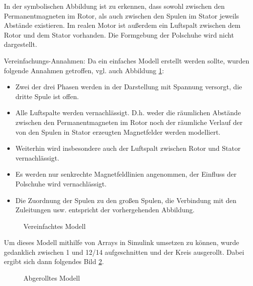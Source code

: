 In der symbolischen Abbildung ist zu erkennen, dass sowohl zwischen den Permanentmagneten im Rotor, als auch zwischen den Spulen im Stator jeweils Abstände existieren. 
Im realen Motor ist außerdem ein Luftspalt zwischen dem Rotor und dem Stator vorhanden. 
Die Formgebung der Polschuhe wird nicht dargestellt.


Vereinfachungs-Annahmen: 
Da ein einfaches Modell erstellt werden sollte, wurden folgende Annahmen getroffen, vgl. auch Abbildung \ref{FigVereinfachtesModell}:
\begin{itemize}
	\item Zwei der drei Phasen werden in der Darstellung mit Spannung versorgt, die dritte Spule ist offen.
	\item Alle Luftspalte werden vernachlässigt. D.h. weder die räumlichen Abstände zwischen den Permanentmagneten im Rotor noch der räumliche Verlauf der von den Spulen in Stator erzeugten Magnetfelder werden modelliert. 
	\item Weiterhin wird insbesondere auch der Luftspalt zwischen Rotor und Stator vernachlässigt.
	\item Es werden nur senkrechte Magnetfeldlinien angenommen, der Einfluss der Polschuhe wird vernachlässigt.
	\item Die Zuordnung der Spulen zu den großen Spulen, die Verbindung mit den Zuleitungen usw. entspricht der vorhergehenden Abbildung. 
\end{itemize}

\begin{figure}[htbp]
	\begin{center}
		
		\caption{Vereinfachtes Modell}
		\label{FigVereinfachtesModell}
	\end{center}
	
\end{figure}


Um dieses Modell mithilfe von Arrays in Simulink umsetzen zu können, wurde gedanklich zwischen 1 und 12/14 aufgeschnitten und der Kreis ausgerollt. Dabei ergibt sich dann folgendes Bild \ref{FigAbgerolltesModell}.


\begin{figure}[htbp]
	\begin{center}
		
		\caption{Abgerolltes Modell}
		\label{FigAbgerolltesModell}
	\end{center}
	
\end{figure}

